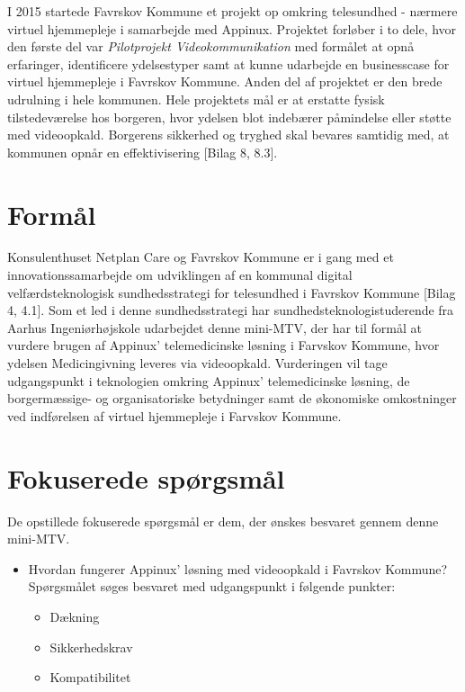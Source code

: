 I 2015 startede Favrskov Kommune et projekt op omkring telesundhed - nærmere virtuel hjemmepleje i samarbejde med Appinux. Projektet forløber i to dele, hvor den første del var \textit{Pilotprojekt Videokommunikation} med formålet at opnå erfaringer, identificere ydelsestyper samt at kunne udarbejde en businesscase for virtuel hjemmepleje i Favrskov Kommune. Anden del af projektet er den brede udrulning i hele kommunen. Hele projektets mål er at erstatte fysisk tilstedeværelse hos borgeren, hvor ydelsen blot indebærer påmindelse eller støtte med videoopkald. Borgerens sikkerhed og tryghed skal bevares samtidig med, at kommunen opnår en effektivisering [Bilag 8, 8.3]. 

\section{Formål}
Konsulenthuset Netplan Care og Favrskov Kommune er i gang med et innovationssamarbejde om udviklingen af en kommunal digital velfærdsteknologisk sundhedsstrategi for telesundhed i Favrskov Kommune [Bilag 4, 4.1]. Som et led i denne sundhedsstrategi har sundhedsteknologistuderende fra Aarhus Ingeniørhøjskole udarbejdet denne mini-MTV, der har til formål at vurdere brugen af Appinux' telemedicinske løsning i Farvskov Kommune, hvor ydelsen Medicingivning 
 leveres via videoopkald. Vurderingen vil tage udgangspunkt i teknologien omkring Appinux' telemedicinske løsning, de borgermæssige- og organisatoriske betydninger samt de økonomiske omkostninger ved indførelsen af virtuel hjemmepleje i Farvskov Kommune.  

\section{Fokuserede spørgsmål}
De opstillede fokuserede spørgsmål er dem, der ønskes besvaret gennem denne mini-MTV. 

\begin{itemize}
	\item Hvordan fungerer Appinux' løsning med videoopkald i Favrskov Kommune? \\Spørgsmålet søges besvaret med udgangspunkt i følgende punkter:
	\begin{itemize}
	\item Dækning
	\item Sikkerhedskrav
	\item Kompatibilitet 
\end{itemize}
\end{itemize}

